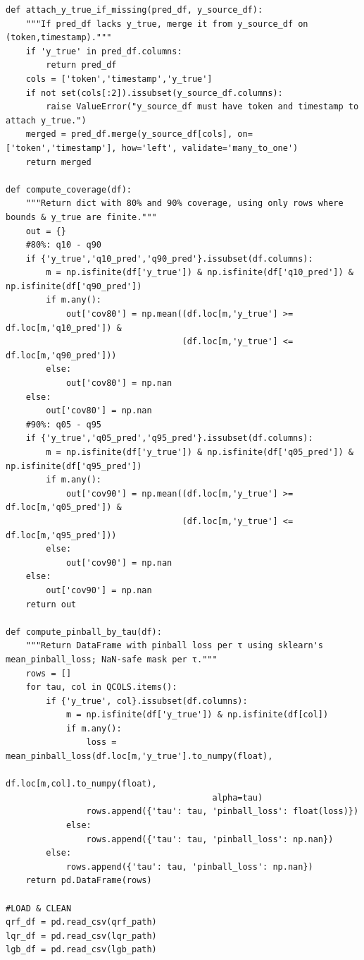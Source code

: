 \documentclass[
  a4paper,
  DIV=11,
  numbers=noendperiod]{scrreprt}
\begin{document}
\begin{verbatim}
def attach_y_true_if_missing(pred_df, y_source_df):
    """If pred_df lacks y_true, merge it from y_source_df on (token,timestamp)."""
    if 'y_true' in pred_df.columns:
        return pred_df
    cols = ['token','timestamp','y_true']
    if not set(cols[:2]).issubset(y_source_df.columns):
        raise ValueError("y_source_df must have token and timestamp to attach y_true.")
    merged = pred_df.merge(y_source_df[cols], on=['token','timestamp'], how='left', validate='many_to_one')
    return merged

def compute_coverage(df):
    """Return dict with 80% and 90% coverage, using only rows where bounds & y_true are finite."""
    out = {}
    #80%: q10 - q90
    if {'y_true','q10_pred','q90_pred'}.issubset(df.columns):
        m = np.isfinite(df['y_true']) & np.isfinite(df['q10_pred']) & np.isfinite(df['q90_pred'])
        if m.any():
            out['cov80'] = np.mean((df.loc[m,'y_true'] >= df.loc[m,'q10_pred']) &
                                   (df.loc[m,'y_true'] <= df.loc[m,'q90_pred']))
        else:
            out['cov80'] = np.nan
    else:
        out['cov80'] = np.nan
    #90%: q05 - q95
    if {'y_true','q05_pred','q95_pred'}.issubset(df.columns):
        m = np.isfinite(df['y_true']) & np.isfinite(df['q05_pred']) & np.isfinite(df['q95_pred'])
        if m.any():
            out['cov90'] = np.mean((df.loc[m,'y_true'] >= df.loc[m,'q05_pred']) &
                                   (df.loc[m,'y_true'] <= df.loc[m,'q95_pred']))
        else:
            out['cov90'] = np.nan
    else:
        out['cov90'] = np.nan
    return out

def compute_pinball_by_tau(df):
    """Return DataFrame with pinball loss per τ using sklearn's mean_pinball_loss; NaN-safe mask per τ."""
    rows = []
    for tau, col in QCOLS.items():
        if {'y_true', col}.issubset(df.columns):
            m = np.isfinite(df['y_true']) & np.isfinite(df[col])
            if m.any():
                loss = mean_pinball_loss(df.loc[m,'y_true'].to_numpy(float),
                                         df.loc[m,col].to_numpy(float),
                                         alpha=tau)
                rows.append({'tau': tau, 'pinball_loss': float(loss)})
            else:
                rows.append({'tau': tau, 'pinball_loss': np.nan})
        else:
            rows.append({'tau': tau, 'pinball_loss': np.nan})
    return pd.DataFrame(rows)

#LOAD & CLEAN 
qrf_df = pd.read_csv(qrf_path)
lqr_df = pd.read_csv(lqr_path)
lgb_df = pd.read_csv(lgb_path)


\end{verbatim}
\end{document}
